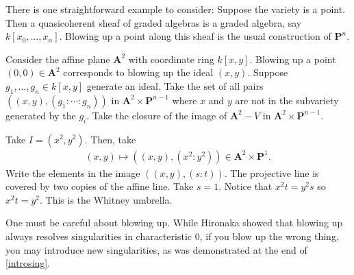 \documentclass[11pt, oneside,margin=1in]{article}
\begin{document}
There is one straightforward example to consider: Suppose the variety is a point. Then a quasicoherent sheaf of graded algebras is a graded algebra, say $k[x_0,\hdots,x_n]$. Blowing up a point along this sheaf is the usual construction of $\mathbf{P}^n$.

\begin{example}[ ]\label{introsing}\text{}
Consider the affine plane $\mathbf{A}^2$ with coordinate ring $k[x,y]$. Blowing up a point $(0,0)\in  \mathbf{A}^2$ corresponds to blowing up the ideal $(x,y)$. Suppose $g_1,\hdots, g_n\in k[x,y]$ generate an ideal. Take the set of all pairs $((x,y), (g_1:\cdots:g_n))$ in $\mathbf{A}^2\times \mathbf{P}^{n-1}$ where $x$ and $y$ are not in the subvariety generated by the $g_i$. Take the closure of the image of $\mathbf{A}^2- V$ in $\mathbf{A}^2\times \mathbf{P}^{n-1}$.

Take $I=(x^2,y^2)$. Then, take 
\begin{align*}
	(x,y)\longmapsto  ((x,y), (x^2:y^2)) \in \mathbf{A}^2\times \mathbf{P}^1.
\end{align*}
Write the elements in the image $((x,y),  (s:t))$. The projective line is covered by two copies of the affine line. Take $s=1$. Notice that $x^2t = y^2s$ so $x^2t=y^2$. This is the Whitney umbrella.
\end{example}

\begin{warn}
	One must be careful about blowing up. While Hironaka showed that blowing up always resolves singularities in characteristic $0$, if you blow up the wrong thing, you may introduce new singularities, as was demonstrated at the end of \cref{introsing}.
\end{warn}
\end{document}
